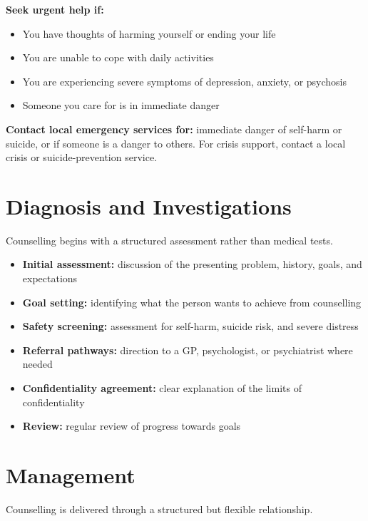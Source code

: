 \textbf{Seek urgent help if:}
\begin{itemize}
    \item You have thoughts of harming yourself or ending your life
    \item You are unable to cope with daily activities
    \item You are experiencing severe symptoms of depression, anxiety, or psychosis
    \item Someone you care for is in immediate danger
\end{itemize}

\textbf{Contact local emergency services for:} immediate danger of self-harm or suicide, or if someone is a danger to others. For crisis support, contact a local crisis or suicide-prevention service.

\section*{Diagnosis and Investigations}
Counselling begins with a structured assessment rather than medical tests.

\begin{itemize}
    \item \textbf{Initial assessment:} discussion of the presenting problem, history, goals, and expectations
    \item \textbf{Goal setting:} identifying what the person wants to achieve from counselling
    \item \textbf{Safety screening:} assessment for self-harm, suicide risk, and severe distress
    \item \textbf{Referral pathways:} direction to a GP, psychologist, or psychiatrist where needed
    \item \textbf{Confidentiality agreement:} clear explanation of the limits of confidentiality
    \item \textbf{Review:} regular review of progress towards goals
\end{itemize}

\section*{Management}
Counselling is delivered through a structured but flexible relationship.

